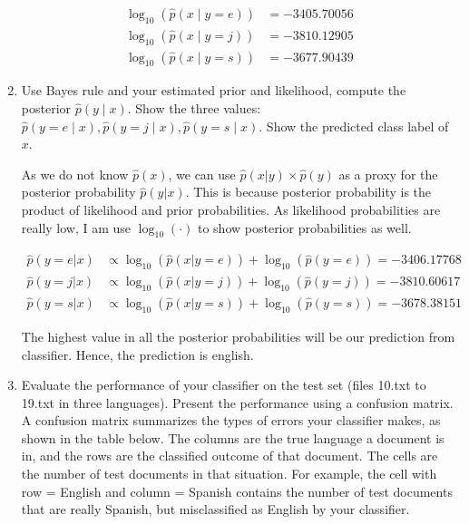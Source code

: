 \documentclass[a4paper]{article}
\theoremstyle{definition}
\newenvironment{soln}{
    \leavevmode\color{blue}\ignorespaces
}{}
\begin{document}
\begin{enumerate}
\begin{soln}
    \begin{align*}
        \log_{10}(\hat{p}(x \mid y = e)) &= -3405.70056\\
        \log_{10}(\hat{p}(x \mid y = j)) &= -3810.12905\\
        \log_{10}(\hat{p}(x \mid y = s)) &= -3677.90439
    \end{align*}
\end{soln}
\pagebreak

\item
Use Bayes rule and your estimated prior and likelihood, compute the posterior $\hat p(y \mid x)$.
Show the three values: $\hat p(y=e \mid x), \hat p(y=j \mid x), \hat p(y=s \mid x)$.
Show the predicted class label of $x$.

\begin{soln}
    As we do not know $\hat{p}(x)$, we can use $\hat{p}(x | y) \times \hat{p}(y)$ as a proxy for the posterior probability $\hat{p}(y | x)$. This is because posterior probability is the product of likelihood and prior probabilities. As likelihood probabilities are really low, I am use $\log_{10}(\cdot)$ to show posterior probabilities as well.

    \begin{align*}
        \hat{p}(y = e | x) &\propto \log_{10}(\hat{p}(x | y = e)) + \log_{10}(\hat{p}(y = e)) = -3406.17768 \\
        \hat{p}(y = j | x) &\propto \log_{10}(\hat{p}(x | y = j)) + \log_{10}(\hat{p}(y = j)) = -3810.60617 \\
        \hat{p}(y = s | x) &\propto \log_{10}(\hat{p}(x | y = s)) + \log_{10}(\hat{p}(y = s)) = -3678.38151
    \end{align*}

    The highest value in all the posterior probabilities will be our prediction from classifier. Hence, the prediction is \textsf{english}.
\end{soln}
\pagebreak

\item
Evaluate the performance of your classifier on the test set (files 10.txt to 19.txt in three languages).
Present the performance using a confusion matrix. A confusion matrix summarizes the types of errors your classifier makes, as shown in the table below.   The columns are the true language a document is in, and the rows are the classified outcome of that document.  The cells are the number of test documents in that situation.  For example, the cell with row = English and column = Spanish contains the number of test documents that are really Spanish, but misclassified as English by your classifier.


\end{enumerate}
\end{document}

